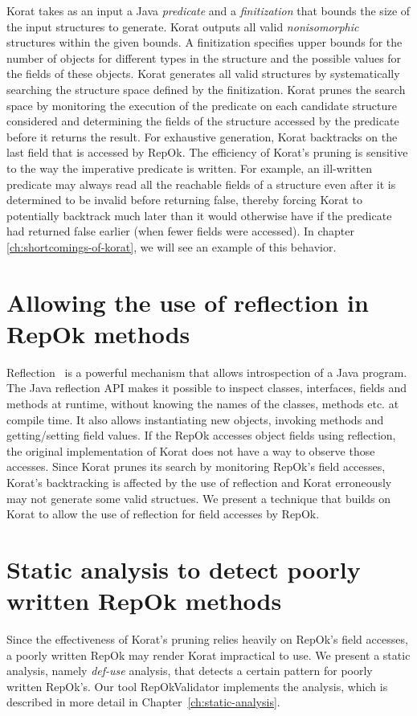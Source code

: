 \para Korat takes as an input a Java \emph{predicate} and a
\emph{finitization} that bounds the size of the input structures to
generate.  Korat outputs all valid \emph{nonisomorphic} structures
within the given bounds. A finitization specifies upper bounds for the
number of objects for different types in the structure and the
possible values for the fields of these objects. Korat generates all
valid structures by systematically searching the structure space
defined by the finitization. Korat prunes the search space by
monitoring the execution of the predicate on each candidate structure
considered and determining the fields of the structure accessed by the
predicate before it returns the result. For exhaustive generation,
Korat backtracks on the last field that is accessed by RepOk.  The
efficiency of Korat's pruning is sensitive to the way the imperative
predicate is written. For example, an ill-written predicate may always
read all the reachable fields of a structure even after it is
determined to be invalid before returning false, thereby forcing Korat
to potentially backtrack much later than it would otherwise have if
the predicate had returned false earlier (when fewer fields were
accessed).  In chapter \ref{ch:shortcomings-of-korat}, we will see an
example of this behavior.

\section{Allowing the use of reflection in RepOk methods}
\label{sec:allowing-reflection-repok}
Reflection~\cite{maes1987concepts,bracha2004mirrors,mostinckx2009mirror} is a powerful mechanism that allows
introspection of a Java program.  The Java reflection API makes it
possible to inspect classes, interfaces, fields and methods at
runtime, without knowing the names of the classes, methods etc. at
compile time. It also allows instantiating new objects, invoking
methods and getting/setting field values.  If the RepOk accesses
object fields using reflection, the original implementation of Korat
does not have a way to observe those accesses.  Since Korat prunes its
search by monitoring RepOk's field accesses, Korat's backtracking is
affected by the use of reflection and Korat erroneously may not
generate some valid structues.  We present a technique that builds on
Korat to allow the use of reflection for field accesses by RepOk.

\section{Static analysis to detect poorly written RepOk methods}
\label{sec:static-analysis-poorly-written-repok}
Since the effectiveness of Korat's pruning relies heavily on RepOk's
field accesses, a poorly written RepOk may render Korat impractical to
use.  We present a static analysis, namely \emph{def-use} analysis,
that detects a certain pattern for poorly written RepOk's.  Our tool
RepOkValidator implements the analysis, which is described in more
detail in Chapter~\ref{ch:static-analysis}.

